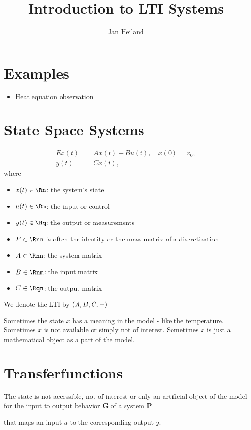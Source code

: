 \documentclass[a4paper,10pt]{article}
\title{Introduction to LTI Systems}
\author{Jan Heiland}
\begin{document}
\maketitle
\tableofcontents


\section{Examples}
\begin{itemize}
	\item Heat equation observation
\end{itemize}
\section{State Space Systems}
\begin{align*}
	Ex(t) &= Ax(t) + Bu(t), \quad x(0) = x_0, \\
	y(t) &= Cx(t),
\end{align*}
where 
\begin{itemize}
	\item $x(t) \in \Rn$: the system's state
	\item $u(t) \in \Rm$: the input or control
	\item $y(t) \in \Rq$: the output or measurements
	\item $E \in \Rnn$ is often the identity or the mass matrix of a discretization
	\item $A \in \Rnn$: the system matrix
	\item $B \in \Rnm$: the input matrix
	\item $C \in \Rqn$: the output matrix
\end{itemize}

We denote the LTI by $(A,B,C,-)$

Sometimes the state $x$ has a meaning in the model - like the temperature. Sometimes $x$ is not available or simply not of interest. Sometimes $x$ is just a mathematical object as a part of the model. 

\section{Transferfunctions}
The state is not accessible, not of interest or only an artificial object of the model for the input to output behavior $\mathbf G$ of a system $\mathbf P$
\begin{figure}[h]
\centering
{}
\end{figure}
that maps an input $u$ to the corresponding output $y$.
\end{document}
